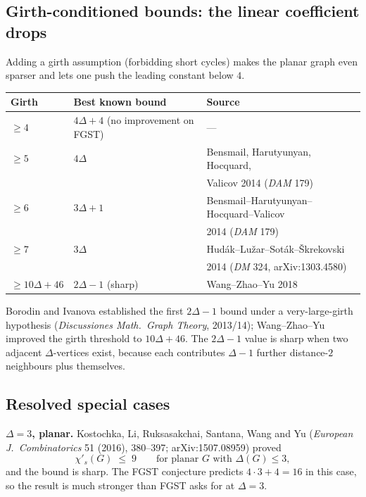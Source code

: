 \documentclass[11pt]{article}
\newcommand{\sci}{\chi'_s}
\begin{document}
\subsection*{Girth-conditioned bounds: the linear coefficient drops}

Adding a girth assumption (forbidding short cycles) makes the
planar graph even sparser and lets one push the leading constant
below $4$.

\begin{center}
\begin{tabular}{l l l}
\textbf{Girth} & \textbf{Best known bound} & \textbf{Source} \\
\hline
$\geq 4$ & $4\Delta + 4$ (no improvement on FGST) & --- \\
$\geq 5$ & $4\Delta$       & Bensmail, Harutyunyan, Hocquard, \\
         &                 & Valicov 2014 (\emph{DAM} 179) \\
$\geq 6$ & $3\Delta + 1$   & Bensmail--Harutyunyan--Hocquard--Valicov \\
         &                 & 2014 (\emph{DAM} 179) \\
$\geq 7$ & $3\Delta$       & Hud\'ak--Lu\v{z}ar--Sot\'ak--\v{S}krekovski \\
         &                 & 2014 (\emph{DM} 324, arXiv:1303.4580) \\
$\geq 10\Delta+46$ & $2\Delta - 1$ (sharp) & Wang--Zhao--Yu 2018 \\
\end{tabular}
\end{center}

Borodin and Ivanova established the first $2\Delta-1$ bound under a
very-large-girth hypothesis (\emph{Discussiones Math.\ Graph Theory},
2013/14); Wang--Zhao--Yu improved the girth threshold to
$10\Delta + 46$. The $2\Delta - 1$ value is sharp when two adjacent
$\Delta$-vertices exist, because each contributes $\Delta - 1$ further
distance-$2$ neighbours plus themselves.

\subsection*{Resolved special cases}

\textbf{$\Delta = 3$, planar.} Kostochka, Li, Ruksasakchai, Santana,
Wang and Yu (\emph{European J.\ Combinatorics} 51 (2016), 380--397;
arXiv:1507.08959) proved
\[
  \sci(G) \;\leq\; 9 \qquad \text{for planar } G \text{ with } \Delta(G) \leq 3,
\]
and the bound is sharp. The FGST conjecture predicts $4 \cdot 3 + 4 = 16$
in this case, so the result is much stronger than FGST asks for at
$\Delta = 3$.
\end{document}
